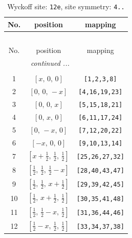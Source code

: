 \documentclass[fleqn,8pt]{jsarticle}
\begin{document}
\begin{longtable}{ccc}
\caption{Wyckoff site: {\tt 12e}, site symmetry: {\tt 4..}}
 \\
 \hline \hline
No. & position & mapping \\ \hline \endfirsthead

\multicolumn{2}{l}{\tablename\ \thetable{}} \\
 \hline \hline
No. & position & mapping \\ \hline \endhead

 \hline \hline
\multicolumn{2}{r}{\footnotesize\it continued ...} \\ \endfoot

 \hline \hline
\multicolumn{2}{r}{} \\ \endlastfoot

1 & $\left[ x,\, 0,\, 0 \right]$ & {\tt [1,2,3,8]} \\ \hline
2 & $\left[ 0,\, 0,\, - x \right]$ & {\tt [4,16,19,23]} \\ \hline
3 & $\left[ 0,\, 0,\, x \right]$ & {\tt [5,15,18,21]} \\ \hline
4 & $\left[ 0,\, x,\, 0 \right]$ & {\tt [6,11,17,24]} \\ \hline
5 & $\left[ 0,\, - x,\, 0 \right]$ & {\tt [7,12,20,22]} \\ \hline
6 & $\left[ - x,\, 0,\, 0 \right]$ & {\tt [9,10,13,14]} \\ \hline
7 & $\left[ x + \frac{1}{2},\, \frac{1}{2},\, \frac{1}{2} \right]$ & {\tt [25,26,27,32]} \\ \hline
8 & $\left[ \frac{1}{2},\, \frac{1}{2},\, \frac{1}{2} - x \right]$ & {\tt [28,40,43,47]} \\ \hline
9 & $\left[ \frac{1}{2},\, \frac{1}{2},\, x + \frac{1}{2} \right]$ & {\tt [29,39,42,45]} \\ \hline
10 & $\left[ \frac{1}{2},\, x + \frac{1}{2},\, \frac{1}{2} \right]$ & {\tt [30,35,41,48]} \\ \hline
11 & $\left[ \frac{1}{2},\, \frac{1}{2} - x,\, \frac{1}{2} \right]$ & {\tt [31,36,44,46]} \\ \hline
12 & $\left[ \frac{1}{2} - x,\, \frac{1}{2},\, \frac{1}{2} \right]$ & {\tt [33,34,37,38]} \\
\end{longtable}
\renewcommand{\arraystretch}{1.2}
\end{document}
